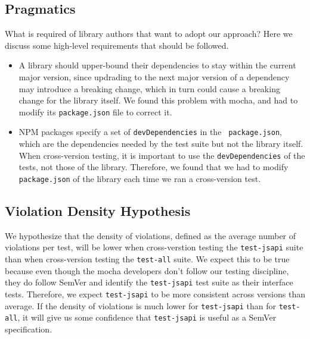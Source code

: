 \subsection{Pragmatics}
What is required of library authors that want to adopt our approach?
Here we discuss some high-level requirements that should be followed.

\begin{itemize}
\item A library should upper-bound their dependencies to stay within
  the current major version, since updrading to the next major version
  of a dependency may introduce a breaking change, which in turn could
  cause a breaking change for the library itself. We found this
  problem with mocha, and had to modify its {\tt package.json} file to
  correct it.
\item NPM packages specify a set of {\tt devDependencies} in the {\tt
    package.json}, which are the dependencies needed by the test suite
  but not the library itself. When cross-version testing, it is
  important to use the {\tt devDependencies} of the tests, not those
  of the library. Therefore, we found that we had to modify {\tt
    package.json} of the library each time we ran a cross-version
  test.
\end{itemize}

\subsection{Violation Density Hypothesis}
We hypothesize that the density of violations, defined as the average
number of violations per test, will be lower when cross-verstion
testing the {\tt test-jsapi} suite than when cross-version testing the
{\tt test-all} suite. We expect this to be true because even though
the mocha developers don't follow our testing discipline, they do
follow SemVer and identify the {\tt test-jsapi} test suite as their
interface tests. Therefore, we expect {\tt test-jsapi} to be more
consistent across versions than average. If the density of violations
is much lower for {\tt test-jsapi} than for {\tt test-all}, it will
give us some confidence that {\tt test-jsapi} is useful as a SemVer
specification.

